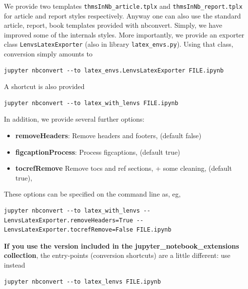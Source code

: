 We provide two templates \texttt{thmsInNb\_article.tplx} and
\texttt{thmsInNb\_report.tplx} for article and report styles
respectively. Anyway one can also use the standard article, report, book
templates provided with nbconvert. Simply, we have improved some of the
internals styles. More importantly, we provide an exporter class
\texttt{LenvsLatexExporter} (also in library \texttt{latex\_envs.py}).
Using that class, conversion simply amounts to

\begin{verbatim}
jupyter nbconvert --to latex_envs.LenvsLatexExporter FILE.ipynb
\end{verbatim}

A shortcut is also provided

\begin{verbatim}
jupyter nbconvert --to latex_with_lenvs FILE.ipynb
\end{verbatim}

In addition, we provide several further options:

\begin{itemize}
\tightlist
\item
  \textbf{removeHeaders}: Remove headers and footers, (default false)
\item
  \textbf{figcaptionProcess}: Process figcaptions, (default true)
\item
  \textbf{tocrefRemove} Remove tocs and ref sections, + some cleaning,
  (default true),
\end{itemize}

These options can be specified on the command line as, eg,

\begin{verbatim}
jupyter nbconvert --to latex_with_lenvs --LenvsLatexExporter.removeHeaders=True -- LenvsLatexExporter.tocrefRemove=False FILE.ipynb
\end{verbatim}

\textbf{If you use the version included in the
jupyter\_notebook\_extensions collection}, the entry-points (conversion
shortcuts) are a little different: use instead

\begin{verbatim}
jupyter nbconvert --to latex_lenvs FILE.ipynb
\end{verbatim}

